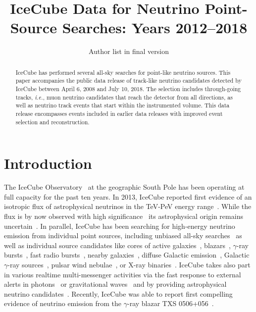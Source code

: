 \documentclass[aps,10pt,prd,twocolumn,floats,letterpaper,showpacs,nofootinbib,bibnotes,notitlepage,superscriptaddress,floatfix]{revtex4-1}
\begin{document}
\title{IceCube Data for Neutrino Point-Source Searches: Years 2012--2018}

\author{Author list in final version}
%
\noaffiliation

\pacs{}

\begin{abstract}
IceCube has performed several all-sky searches for point-like neutrino sources. This paper accompanies the public data release of track-like neutrino candidates detected by IceCube between April 6, 2008 and July 10, 2018. The selection includes through-going tracks, {\it i.e.}, muon neutrino candidates that reach the detector from all directions, as well as neutrino track events that start within the instrumented volume. This data release encompasses events included in earlier data releases with improved event selection and reconstruction.
\end{abstract}

\maketitle

\section{Introduction}

The IceCube Observatory~\cite{Aartsen:2016nxy} at the geographic South Pole has been operating at full capacity for the past ten years. In 2013, IceCube reported first evidence of an isotropic flux of astrophysical neutrinos in the TeV-PeV energy range~\cite{Aartsen:2013bka,Aartsen:2013jdh}. While the flux is by now observed with high significance~\cite{Aartsen:2014gkd,Aartsen:2015rwa,Aartsen:2016xlq,IceCube:2018dnn,IceCube:2018cha} its astrophysical origin remains uncertain~\cite{Ahlers:2018fkn}. In parallel, IceCube has been searching for high-energy neutrino emission from individual point sources, including unbiased all-sky searches~\cite{Abbasi:2010rd,Aartsen:2013uuv,Aartsen:2014cva,Aartsen:2014cva,Aartsen:2018ywr,Aartsen:2019fau} as well as individual source candidates like cores of active galaxies~\cite{Bradascio:2019xdd}, blazars~\cite{Aartsen:2016lir}, $\gamma$-ray bursts~\cite{Abbasi:2012zw,Aartsen:2014aqy,Aartsen:2016qcr,Aartsen:2017wea}, fast radio bursts~\cite{Aartsen:2017zvw}, nearby galaxies~\cite{Aartsen:2019xkn}, diffuse Galactic emission~\cite{Albert:2018vxw}, Galactic $\gamma$-ray sources~\cite{Kheirandish:2019bke}, pulsar wind nebulae~\cite{Aartsen:2020eof}, or X-ray binaries~\cite{Abbasi:2011ke}. IceCube takes also part in various realtime multi-messenger activities via the fast response to external alerts in photons~\cite{Abbasi:2011ja,Aartsen:2015trq} or gravitational waves~\cite{Adrian-Martinez:2016xgn,ANTARES:2017iky,Aartsen:2020mla} and by providing astrophysical neutrino candidates~\cite{Aartsen:2016lmt,AyalaSolares:2020ing}. Recently, IceCube was able to report first compelling evidence of neutrino emission from the $\gamma$-ray blazar TXS 0506+056~\cite{Finley:2019vpk,IceCube:2018cha}.
\end{document}
